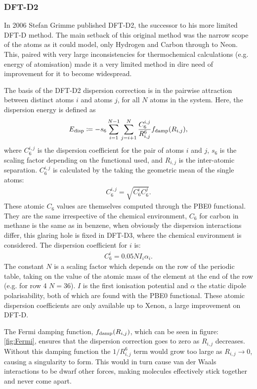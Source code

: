 \documentclass[10pt,a4paper,twocolumn,twoside]{extarticle}
\begin{document}
	\subsubsection{DFT-D2}
	In 2006 Stefan Grimme published DFT-D2\cite{Grimme2006}, 
	the successor to his more limited DFT-D method. The main setback of this original method was the narrow scope of the atoms as it could model, only Hydrogen and Carbon through to Neon. This, paired with very large inconsistencies for thermochemical calculations (e.g. energy of atomisation) made it a very limited method in dire need of improvement for it to become widespread.

	The basis of the DFT-D2 dispersion correction is in the pairwise attraction between distinct atoms $i$ and atoms $j$, for all $N$ atoms in the system.\cite{Grimme2006}
    Here, the dispersion energy is defined as
	\begin{align} \label{eq:D2}
	E_{\rm disp} \coloneqq -s_6 \sum^{N-1}_{i=1} \sum^N_{j=i+1}  \frac{C^{i,j}_{6}}{R^6_{i,j}} f_{\rm damp}(R_{i,j}),
	\end{align} 
	\noindent
	where $C_6^{i,j}$ is the dispersion coefficient for the pair of atoms $i$ and $j$, $s_6$ is the scaling factor depending on the functional used, and $R_{i,j}$ is the inter-atomic separation. 
	$C_6^{i,j}$ is calculated by the taking the geometric mean of the single atoms:
	\begin{align} \label{eq:C6ij}
		C_6^{i,j} = \sqrt{C_6^i C_6^j}.
	\end{align}
	These atomic $C_6$ values are themselves computed through the PBE0 functional\cite{Grimme2011}. They are the same irrespective of the chemical environment, $C_6$ for carbon in methane is the same as in benzene, when obviously the dispersion interactions differ, this glaring hole is fixed in DFT-D3, where the chemical environment is considered.
	The dispersion coefficient for $i$ is: 
	\begin{align} \label{eq:C6i}
		C_6^i = 0.05NI_i \alpha_i.
	\end{align}
	The constant $N$ is a scaling factor which depends on the row of the periodic table, taking on the value of the atomic mass of the element at the end of the row (e.g. for row 4 $N = 36$). $I$ is the first ionisation potential and $\alpha$ the static dipole polarisability, both of which are found with the PBE$0$ functional. These atomic dispersion coefficients are only available up to Xenon, a large improvement on DFT-D.

	The Fermi damping function, $f_{\rm damp}(R_{i,j})$, which can be seen in figure: \ref{fig:Fermi}, ensures that the dispersion correction goes to zero as $R_{i,j}$ decreases. Without this damping function the $1/R_{i,j}^6$ term would grow too large as $R_{i,j} \rightarrow 0$, causing a singularity to form. This would in turn cause van der Waals interactions to be dwarf other forces, making molecules effectively stick together and never come apart.
    
\end{document}
